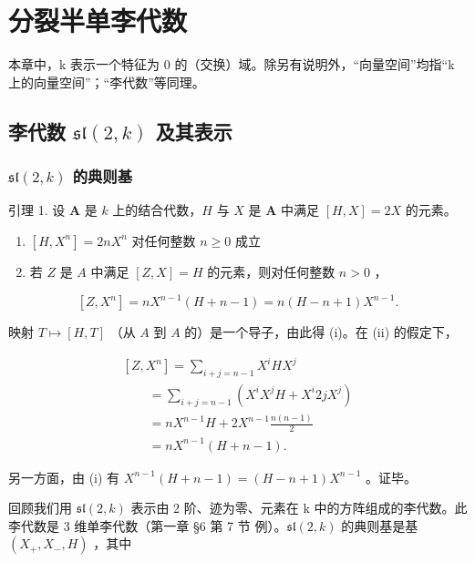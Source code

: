 \chapter{分裂半单李代数}

本章中，k 表示一个特征为 0 的（交换）域。除另有说明外，“向量空间”均指“k 上的向量空间”；“李代数”等同理。

\section{\texorpdfstring{李代数 \(\mathfrak{sl}(2,k)\) 及其表示}{李代数 \textbackslash mathfrak\{sl\}(2,k) 及其表示}}

\subsection{\texorpdfstring{\(\mathfrak{sl}(2,k)\) 的典则基}{\textbackslash mathfrak\{sl\}(2,k) 的典则基}}

引理 1. 设 \(\mathbf{A}\) 是 \(k\) 上的结合代数，\(H\) 与 \(X\) 是 \(\mathbf{A}\) 中满足 \([H, X] = 2X\) 的元素。

\begin{enumerate}
\def\labelenumi{(\roman{enumi})}
\item
  \([H,X^n ] = 2nX^n\) 对任何整数 \(n\geq 0\) 成立
\item
  若 \(Z\) 是 \(A\) 中满足 \([Z, X] = H\) 的元素，则对任何整数 \(n > 0\) ，
\end{enumerate}

\[
[ Z, X ^ {n} ] = n X ^ {n - 1} (H + n - 1) = n (H - n + 1) X ^ {n - 1}.
\]

映射 \(T \mapsto [H, T]\) （从 \(A\) 到 \(A\) 的）是一个导子，由此得 (i)。在 (ii) 的假定下，

\[
\begin{array}{l} [ Z, X ^ {n} ] = \sum_ {i + j = n - 1} X ^ {i} H X ^ {j} \\ \qquad = \sum_ {i + j = n - 1} (X ^ {i} X ^ {j} H + X ^ {i} 2 j X ^ {j}) \\ \qquad = n X ^ {n - 1} H + 2 X ^ {n - 1} \frac {n (n - 1)}{2} \\ \qquad = n X ^ {n - 1} (H + n - 1). \end{array}
\]

另一方面，由 (i) 有 \(X^{n-1}(H+n-1)=(H-n+1)X^{n-1}\) 。证毕。

回顾我们用 \(\mathfrak{sl}(2,k)\) 表示由 2 阶、迹为零、元素在 k 中的方阵组成的李代数。此李代数是 3 维单李代数（第一章 §6 第 7 节 例）。\(\mathfrak{sl}(2,k)\) 的典则基是基 \((X_{+},X_{-},H)\) ，其中

